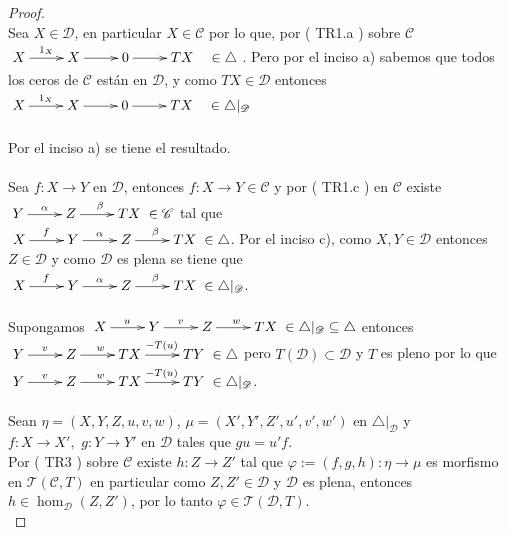 \documentclass{article}
\begin{document}
\begin{enumerate}
\begin{proof}
\\
Sea $X\in \mathscr{D}$, en particular  $X\in \mathscr{C}$ por lo que, por ( TR1.a ) sobre $\mathscr{C}$
\\$\xymatrix{X\ar[r]^{1_X}&X\ar[r]&0\ar[r]&TX\quad\in \triangle}$.
Pero por el inciso a) sabemos que todos los ceros de $\mathscr{C}$ están en $\mathscr{D}$, y como $TX\in \mathscr{D}$  entonces \\
$\xymatrix{X\ar[r]^{1_X}&X\ar[r]&0\ar[r]&TX\quad\in \triangle|_{\mathscr{D}}}$\\

\\
Por el inciso a) se tiene el resultado.\\

\\
Sea $f:X\to Y$ en $\mathscr{D}$, entonces $f:X\to Y\in \mathscr{C}$ y por ( TR1.c ) en $\mathscr{C}$ existe
$\xymatrix{Y\ar[r]^{\alpha}&Z\ar[r]^{\beta}&TX}\in \mathscr{C}$ tal que \\
$\xymatrix{X\ar[r]^{f}&Y\ar[r]^{\alpha}&Z\ar[r]^{\beta}&TX}\in \triangle$. Por el inciso c), como $X,Y\in \mathscr{D}$ entonces $Z\in \mathscr{D}$
y como $\mathscr{D}$ es plena se tiene que \\$\xymatrix{X\ar[r]^{f}&Y\ar[r]^{\alpha}&Z\ar[r]^{\beta}&TX}\in \triangle|_{\mathscr{D}}$.\\

\\
Supongamos $\xymatrix{X\ar[r]^{u}&Y\ar[r]^{v}&Z\ar[r]^{w}&TX}\in \triangle|_{\mathscr{D}}\subseteq \triangle$ entonces \\
$\xymatrix{Y\ar[r]^{v}&Z\ar[r]^{w}&TX\ar[r]^{-T(u)}&TY}\in \triangle$ pero $T(\mathscr{D})\subset \mathscr{D}$ y $T$ es pleno por lo que 
$\xymatrix{Y\ar[r]^{v}&Z\ar[r]^{w}&TX\ar[r]^{-T(u)}&TY}\in \triangle|_{\mathscr{D}}$.\\

\\
Sean $\eta=(X,Y,Z,u,v,w)$, $\mu=(X',Y',Z',u',v',w')$ en $\triangle|_{\mathscr{D}}$ y\\$f:X\to X',\,\, g:Y\to Y'$ en $\mathscr{D}$ tales que $gu=u'f$.\\
Por ( TR3 ) sobre $\mathscr{C}$ existe $h:Z\to Z'$ tal que $\varphi:=(f,g,h):\eta\to \mu$ es morfismo en $\mathscr{T}(\mathscr{C},T)$ en particular
como $Z,Z'\in \mathscr{D}$ y $\mathscr{D}$ es plena, entonces $h\in \hom_{\mathscr{D}}(Z,Z')$, por lo tanto $\varphi\in \mathscr{T}(\mathscr{D},T)$.
\\


\end{proof}
\end{enumerate}
\end{document}
